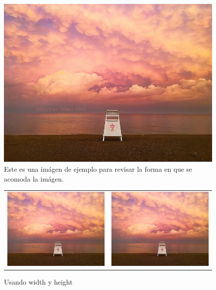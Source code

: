 \documentclass{article}
\begin{document}
\begin{figure}[h]
\centering
\includegraphics[scale=.16]{lago}
\caption{Este es una im\'agen de ejemplo para revisar la forma en que se acomoda la im\'agen.}
\end{figure}

\begin{figure}[h]
\centering
\begin{tabular}{cc} 
\includegraphics[width= 2 cm, height=6 cm]{lago}& \includegraphics[width= 5 cm, height=3 cm]{lago} 
\end{tabular} 
\caption{Usando width y height} 
\end{figure}
\end{document}
